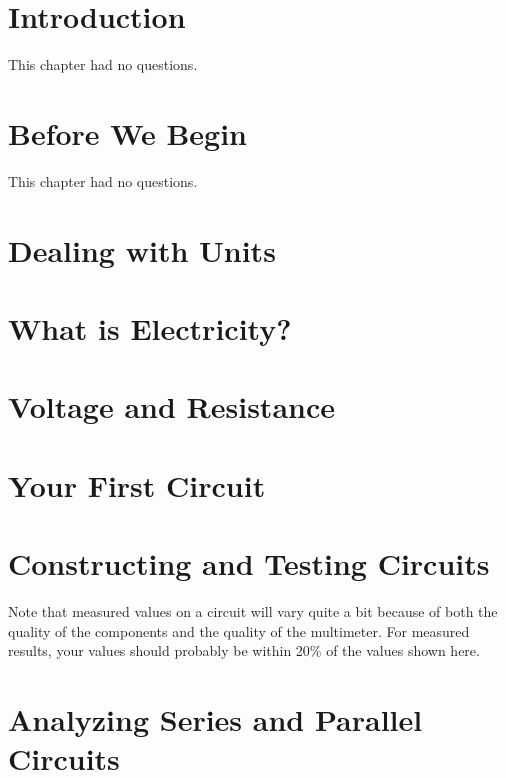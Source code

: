 \documentclass[twocolumn]{book}
\begin{document}
\sloppy

\frontmatter
\tableofcontents
\mainmatter

\chapter{Introduction}

This chapter had no questions.

\chapter{Before We Begin}

This chapter had no questions.

\chapter{Dealing with Units}



\chapter{What is Electricity?}



\chapter{Voltage and Resistance}



\chapter{Your First Circuit}



\chapter{Constructing and Testing Circuits}

Note that measured values on a circuit will vary quite a bit because of both the quality of the components and the quality of the multimeter.
For measured results, your values should probably be within 20\% of the values shown here.



\chapter{Analyzing Series and Parallel Circuits}
\end{document}
